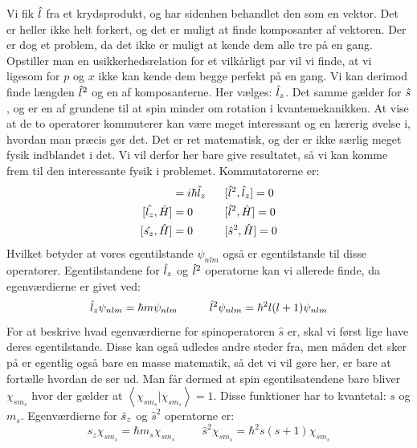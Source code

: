 \documentclass[../../Atom-ogMolekylefysik.tex]{subfiles}
\begin{document}
Vi fik $\hat l$ fra et krydsprodukt, og har sidenhen behandlet den som en vektor. Det er heller ikke helt forkert, og det er muligt at finde komposanter af vektoren. Der er dog et problem, da det ikke er muligt at kende dem alle tre på en gang. Opstiller man en usikkerhedsrelation for et vilkårligt par vil vi finde, at vi ligesom for $p$ og $x$ ikke kan kende dem begge perfekt på en gang. Vi kan derimod finde længden $\hat l^2$ og en af komposanterne. Her vælges: $\hat l_z$. Det samme gælder for $\hat s$, og er en af grundene til at spin minder om rotation i kvantemekanikken.
At vise at de to operatorer kommuterer kan være meget interessant og en lærerig øvelse i, hvordan man præcis gør det. Det er ret matematisk, og der er ikke særlig meget fysik indblandet i det. Vi vil derfor her bare give resultatet, så vi kan komme frem til den interessante fysik i problemet. Kommutatorerne er:
\begin{align}
    [\op l_x,\op l_y] &= i\hbar \op l_z \hspace{0.6cm}[\op l^2,\op l_z] = 0\nonumber\\
    [\hat{l_z},\hat{H}]&=0 \hspace{1cm}[\hat{l}^2,\hat{H}]=0\\
    [\hat{s_z},\hat{H}]&=0 \hspace{1cm}[\hat{s}^2,\hat{H}]=0\nonumber
\end{align}
Hvilket betyder
at vores egentilstande $\psi_{nlm}$ også er egentilstande til disse operatorer. Egentilstandene for $\hat l_z$ og $\hat l^2$ operatorne kan vi allerede finde, da egenværdierne er givet ved: 
\begin{equation}
   \hat l_z\psi_{nlm}=\hbar m\psi_{nlm} \hspace{1cm}\hat{l}^2\psi_{nlm}=\hbar^2l(l+1)\psi_{nlm} 
\end{equation}
For at beskrive hvad egenværdierne for spinoperatoren $\hat{s}$ er, skal vi først lige have deres egentilstande. Disse kan også udledes andre steder fra, men måden det sker på er egentlig også bare en masse matematik, så det vi vil gøre her, er bare at fortælle hvordan de ser ud. Man får dermed at spin egentilsatendene bare bliver $\chi_{sm_s}$ hvor der gælder at $\left<\chi_{sm_s}|\chi_{sm_s}\right>=1$. Disse funktioner har to kvantetal: $s$ og $m_s$. Egenværdierne for $\hat s_z$ og $\hat{s}^2$ operatorne er:
\begin{equation}
   \hat{s}_z\chi_{sm_s}=\hbar m_s\chi_{sm_s} \hspace{1cm}\hat{s}^2\chi_{sm_s}=\hbar^2s(s+1)\chi_{sm_s} 
\end{equation}
\end{document}
